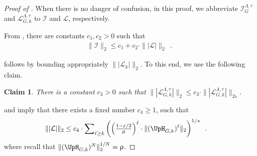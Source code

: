 \documentclass[11pt,reqno]{amsart}
\numberwithin{equation}{section}
\newtheorem{claim}[theorem]{Claim}
\newcommand{\cI}{{\mathcal{I}}}
\newcommand{\cL}{{\mathcal{L}}}
\newcommand{\applegreen}[1]{ {\color{applegreen}#1}}
\newcommand{\blue}[1]{{\color{blue}#1}}
\newcommand{\bluepigment}[1]{{\color{blue(pigment)}#1}}
\newcommand{\cadmiumgreen}[1]{{\color{cadmiumgreen}#1}}
\newcommand{\darkmagenta}[1]{{\color{darkmagenta}#1}}
\newcommand{\goldenbrown}[1]{{\color{goldenbrown}#1}}
\newcommand{\rosegold}[1]{{\color{rosegold}#1}}
\newcommand{\pfs}{\darkmagenta{s}}
\newcommand{\infmatrix}{\cI}
\newcommand{\norm}[2]{\goldenbrown{\|} #1 \goldenbrown{\|}_{#2}}
\newcommand{\nnorm}[3]{\goldenbrown{\|} #1\goldenbrown{\|}^{#2}_{#3}}
\newcommand{\abs}[1]{\blue{|}#1\blue{|}}
\newcommand{\NBMatrix}{\cadmiumgreen{\UpH}_{G,\kk}}
\renewcommand{\applegreen}[1]{#1}
\renewcommand{\blue}[1]{#1}
\renewcommand{\bluepigment}[1]{#1}
\renewcommand{\cadmiumgreen}[1]{#1}
\renewcommand{\darkmagenta}[1]{#1}
\renewcommand{\goldenbrown}[1]{#1}
\renewcommand{\rosegold}[1]{#1}
\newcommand{\kk}{\bluepigment{k}}
\newcommand{\kell}{{\color{green(pigment)}\ell}}%
\renewcommand{\kk}{k}
\renewcommand{\kell}{\ell}
\newcommand{\ExtdInfMatrix}{\rosegold{\cL}}
\newcommand{\ExtdInfMatrixF}{\applegreen{\cL}^{\Lambda,\tau}_{G,\kk}}
\newcommand{\hsingular}{\upsigma}
\newcommand{\SingBound}{\uprho}
\begin{document}
\begin{proof}[Proof of ]
When there is no danger of confusion,  in this proof, we abbreviate 
$\infmatrix^{\Lambda,\tau}_{G}$ and $\ExtdInfMatrixF$ to $\infmatrix$ and $\ExtdInfMatrix$, respectively.



From , there are constants $c_1, c_2>0$ such that 
\begin{align}\label{eq:L2BoundInflNoNuMatrix}
\norm{ \infmatrix}{2}  \leq c_1+c_2\cdot \norm{ \abs{ \ExtdInfMatrix }}{2}  \enspace.
\end{align} 

 follows by bounding appropriately $\norm{ \abs{ \ExtdInfMatrix_{\kk} }}{2}$. 
To this end, we use the following claim. 
 

\begin{claim}\label{claim:Ll2VsLl2s}
There is a constant $c_3>0$ such that $\norm{ \abs{ \ExtdInfMatrixF }}{2}  \leq c_3\cdot \norm{ \abs{ \ExtdInfMatrixF }}{2\pfs}$.
\end{claim}





 and  imply that  there exists a fixed number ${c}_4\geq 1$, such that 
\begin{align}\label{eq:ExtInfN2sBoundWithDistL}
\norm{ \abs{ \ExtdInfMatrix }}{2}  &\leq 
{c}_4\cdot \sum\nolimits_{\kell\geq \kk} 
\left(
 {\textstyle \left(\frac{1-\varepsilon/2}{\SingBound}\right)^{\kell}} \cdot %
\norm{ ( \NBMatrix)^{\kell}}{2}  \right)^{1/\pfs}\enspace.
\end{align}
% 
where recall that $\nnorm{ (\NBMatrix)^N}{1/N}{2}= \SingBound$.



\end{proof}
\end{document}
